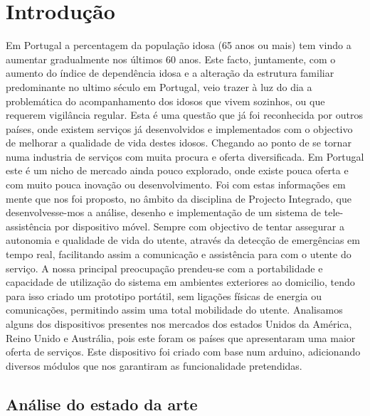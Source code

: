 \chapter{Introdução}
\label{intro}

Em Portugal a percentagem da população idosa (65 anos ou mais) tem vindo a aumentar gradualmente nos últimos 60 anos. Este facto, juntamente, com o aumento do índice de dependência idosa\cite{indice} e a alteração da estrutura familiar predominante no ultimo século em Portugal, veio trazer à luz do dia a problemática do acompanhamento dos idosos que vivem sozinhos, ou que requerem vigilância regular.
Esta é uma questão que já foi reconhecida por outros países, onde existem serviços já desenvolvidos e implementados com o objectivo de melhorar a qualidade de vida destes idosos. Chegando ao ponto de se tornar numa industria de serviços com muita procura e oferta diversificada. Em Portugal este é um nicho de mercado ainda pouco explorado, onde existe pouca oferta e com muito pouca inovação ou desenvolvimento.
Foi com estas informações em mente que nos foi proposto, no âmbito da disciplina de Projecto Integrado, que desenvolvesse-mos a análise, desenho e implementação de um sistema de tele-assistência por dispositivo móvel. Sempre com objectivo de tentar assegurar a autonomia e qualidade de vida do utente, através da detecção de emergências em tempo real, facilitando assim a comunicação e assistência para  com o utente do serviço.
A nossa principal preocupação prendeu-se com a portabilidade e capacidade de utilização do sistema em ambientes exteriores ao domicilio, tendo para isso criado um prototipo portátil, sem ligações físicas de energia ou comunicações, permitindo assim uma total mobilidade do utente.
Analisamos alguns dos dispositivos presentes nos mercados dos estados Unidos da América, Reino Unido e Austrália, pois este foram os países que apresentaram uma maior oferta de serviços.
Este dispositivo foi criado com base num arduino, adicionando diversos módulos que nos garantiram as funcionalidade pretendidas.

\section{Análise do estado da arte}


